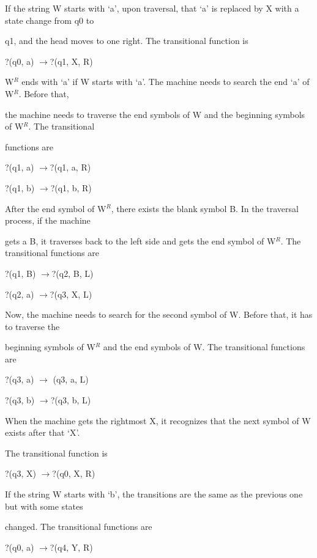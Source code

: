If the string W starts with `a', upon traversal, that `a' is replaced by X with a state change from q0 to

\noindent q1, and the head moves to one right. The transitional function is

\noindent ?(q0, a) $\to $?(q1, X, R)

\noindent W${}^{R}$ ends with `a' if W starts with `a'. The machine needs to search the end `a' of W${}^{R}$. Before that,

\noindent the machine needs to traverse the end symbols of W and the beginning symbols of W${}^{R}$. The transitional

\noindent functions are

\noindent ?(q1, a) $\to $?(q1, a, R)

\noindent ?(q1, b) $\to $?(q1, b, R)

\noindent After the end symbol of W${}^{R}$, there exists the blank symbol B. In the traversal process, if the machine

\noindent gets a B, it traverses back to the left side and gets the end symbol of W${}^{R}$. The transitional functions are

\noindent ?(q1, B) $\to $?(q2, B, L)

\noindent ?(q2, a) $\to $?(q3, X, L)

\noindent Now, the machine needs to search for the second symbol of W. Before that, it has to traverse the

\noindent beginning symbols of W${}^{R}$ and the end symbols of W. The transitional functions are

\noindent ?(q3, a) $\to $ (q3, a, L)

\noindent ?(q3, b) $\to $?(q3, b, L)

\noindent When the machine gets the rightmost X, it recognizes that the next symbol of W exists after that `X'.

\noindent The transitional function is

\noindent ?(q3, X) $\to $?(q0, X, R)

\noindent 

\noindent 

\noindent 

\noindent 

\noindent If the string W starts with `b', the transitions are the same as the previous one but with some states

\noindent changed. The transitional functions are

\noindent ?(q0, a) $\to $?(q4, Y, R)

